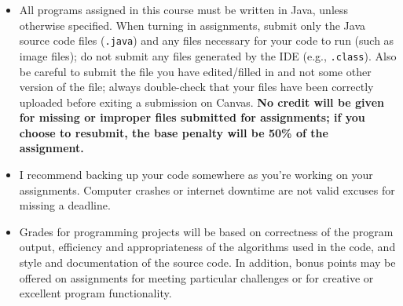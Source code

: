 \documentclass [letterpaper,11pt]{article}
\begin{document}
\begin{description}
\begin{itemize}\setlength{\itemsep}{0em}\setlength{\parskip}{0pt}
	\item All programs assigned in this course must be written in Java, unless otherwise specified.  When turning in assignments,
	submit only the Java source code files (\texttt{.java}) and any files necessary for your code to run (such as image files); do not submit any files generated by the IDE (e.g., \texttt{.class}). Also be careful to submit the file you have edited/filled in and not some other version of the file; always double-check that your files have been correctly uploaded before exiting a submission on Canvas.	\textbf{No credit will be given for missing or improper files submitted for assignments; if you choose to resubmit, the base penalty will be 50\% of the assignment.}
			\item I recommend backing up your code somewhere as you're working on your assignments.  Computer
		crashes or internet downtime are not valid excuses for missing a deadline.
				

\item Grades for programming projects will be based on correctness of the program output, efficiency and appropriateness of the algorithms used in the code, and style and documentation of the source code.  In addition, bonus points may be offered on assignments for meeting particular challenges or for creative or excellent program functionality.


\end{itemize}
\end{description}
\end{document}

